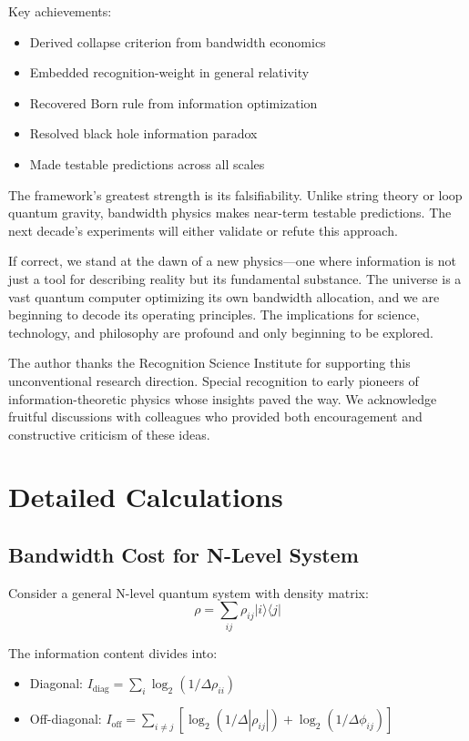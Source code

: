 \documentclass[twocolumn,prd,amsmath,amssymb,aps,superscriptaddress,nofootinbib]{revtex4-2}
\begin{document}
Key achievements:
\begin{itemize}
\item Derived collapse criterion from bandwidth economics
\item Embedded recognition-weight in general relativity  
\item Recovered Born rule from information optimization
\item Resolved black hole information paradox
\item Made testable predictions across all scales
\end{itemize}

The framework's greatest strength is its falsifiability. Unlike string theory or loop quantum gravity, bandwidth physics makes near-term testable predictions. The next decade's experiments will either validate or refute this approach.

If correct, we stand at the dawn of a new physics---one where information is not just a tool for describing reality but its fundamental substance. The universe is a vast quantum computer optimizing its own bandwidth allocation, and we are beginning to decode its operating principles. The implications for science, technology, and philosophy are profound and only beginning to be explored.

\acknowledgments

The author thanks the Recognition Science Institute for supporting this unconventional research direction. Special recognition to early pioneers of information-theoretic physics whose insights paved the way. We acknowledge fruitful discussions with colleagues who provided both encouragement and constructive criticism of these ideas.

\appendix

\section{Detailed Calculations}
\label{app:calculations}

\subsection{Bandwidth Cost for N-Level System}

Consider a general N-level quantum system with density matrix:
\begin{equation}
\rho = \sum_{ij} \rho_{ij} |i\rangle\langle j|
\end{equation}

The information content divides into:
\begin{itemize}
\item Diagonal: $I_{\text{diag}} = \sum_i \log_2(1/\Delta\rho_{ii})$
\item Off-diagonal: $I_{\text{off}} = \sum_{i\neq j} [\log_2(1/\Delta|\rho_{ij}|) + \log_2(1/\Delta\phi_{ij})]$
\end{itemize}
\end{document}
